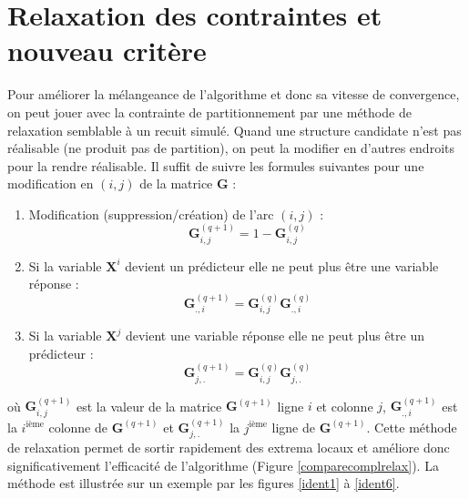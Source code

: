 \documentclass[12pt,a4paper]{report}
\begin{document}
	\section{Relaxation des contraintes et nouveau critère}
		Pour améliorer la mélangeance de l'algorithme et donc sa vitesse de convergence, on peut jouer avec la contrainte de partitionnement par une méthode de relaxation semblable à un recuit simulé. Quand une structure candidate n'est pas réalisable (ne produit pas de partition), on peut la modifier en d'autres endroits pour la rendre réalisable. Il suffit de suivre les formules suivantes pour une modification en $(i,j)$ de la  matrice $\boldsymbol{G}$ :
\begin{enumerate}
	\item Modification (suppression/création) de l'arc $(i,j)$ :
	\begin{equation}
		\boldsymbol{G}_{i,j}^{(q+1)}=1-\boldsymbol{G}_{i,j}^{(q)}  \nonumber 
	\end{equation}
	\item Si la variable $\boldsymbol{X}^i$ devient un prédicteur elle ne peut plus être une variable réponse :
	\begin{equation}
		\boldsymbol{G}_{.,i}^{(q+1)}= \boldsymbol{G}_{i,j}^{(q)}\boldsymbol{G}_{.,i}^{(q)}  \nonumber 
	\end{equation}
	\item Si la variable $\boldsymbol{X}^j$ devient une variable réponse elle ne peut plus être un prédicteur :
	\begin{equation}
		\boldsymbol{G}_{j,.}^{(q+1)}=\boldsymbol{G}_{i,j}^{(q)}\boldsymbol{G}_{j,.}^{(q)}  \nonumber 
	\end{equation}
\end{enumerate}
		où $\boldsymbol{G}_{i,j}^{(q+1)}$ est la valeur de la matrice $\boldsymbol{G}^{(q+1)}$ ligne $i$ et colonne $j$, $\boldsymbol{G}_{.,i}^{(q+1)}$ est la $i^{\textrm{ième}}$ colonne de $\boldsymbol{G}^{(q+1)}$ et $\boldsymbol{G}_{j,.}^{(q+1)}$ la $j^{\textrm{ième}}$ ligne de $\boldsymbol{G}^{(q+1)}$.
		Cette méthode de relaxation permet de sortir rapidement des extrema locaux et améliore donc significativement l'efficacité de l'algorithme (Figure \ref{comparecomplrelax}). La méthode est illustrée sur un exemple par les figures \ref{ident1} à \ref{ident6}.\\
		 
\end{document}

